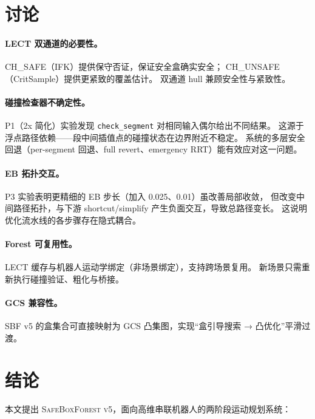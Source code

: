 \documentclass[11pt,a4paper]{article}
\begin{document}
\section{讨论}
\label{sec:discussion}

\paragraph{LECT 双通道的必要性。}
CH\_SAFE（IFK）提供保守否证，保证安全盒确实安全；
CH\_UNSAFE（CritSample）提供更紧致的覆盖估计。
双通道 hull 兼顾安全性与紧致性。

\paragraph{碰撞检查器不确定性。}
P1（2x 简化）实验发现 \texttt{check\_segment} 对相同输入偶尔给出不同结果。
这源于浮点路径依赖——段中间插值点的碰撞状态在边界附近不稳定。
系统的多层安全回退（per-segment 回退、full revert、emergency RRT）能有效应对这一问题。

\paragraph{EB 拓扑交互。}
P3 实验表明更精细的 EB 步长（加入 0.025、0.01）虽改善局部收敛，
但改变中间路径拓扑，与下游 shortcut/simplify 产生负面交互，导致总路径变长。
这说明优化流水线的各步骤存在隐式耦合。

\paragraph{Forest 可复用性。}
LECT 缓存与机器人运动学绑定（非场景绑定），支持跨场景复用。
新场景只需重新执行碰撞验证、粗化与桥接。

\paragraph{GCS 兼容性。}
SBF v5 的盒集合可直接映射为 GCS 凸集图，实现``盒引导搜索 → 凸优化''平滑过渡。


\section{结论}
\label{sec:conclusion}

本文提出 \textsc{SafeBoxForest v5}，面向高维串联机器人的两阶段运动规划系统：
\end{document}
